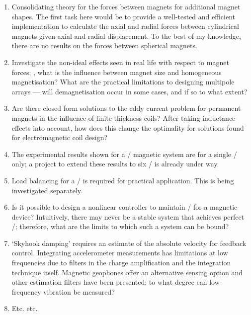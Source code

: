 \begin{enumerate}
\item
Consolidating theory for the forces between magnets for additional magnet shapes.
The first task here would be to provide a well-tested and efficient implementation to calculate the axial and radial forces between cylindrical magnets given axial and radial displacement.
To the best of my knowledge, there are no results on the forces between spherical magnets.

\item
Investigate the non-ideal effects seen in real life with respect to magnet forces; \eg, what is the influence between magnet size and homogeneous magnetisation?
What are the practical limitations to designing multipole arrays — will demagnetisation occur in some cases, and if so to what extent?

\item
Are there closed form solutions to the eddy current problem for permanent magnets in the influence of finite thickness coils?
After taking inductance effects into account, how does this change the optimality for solutions found for electromagnetic coil design?

\item
The experimental results shown for a \qzs/ magnetic system are for a single \dof/ only; a project to extend these results to six \dof/ is already under way.

\item
Load balancing for a \qzs/ is required for practical application.
This is being investigated separately.

\item
Is it possible to design a nonlinear controller to maintain \qzs/ for a magnetic device?
Intuitively, there may never be a stable system that achieves perfect \qzs/; therefore, what are the limits to which such a system can be bound?

\item
`Skyhook damping' requires an estimate of the absolute velocity for feedback control.
Integrating accelerometer measurements has limitations at low frequencies due to filters in the charge amplification and the integration technique itself.
Magnetic geophones offer an alternative sensing option and other estimation filters have been presented; to what degree can low-frequency vibration be measured?

\item
Etc. etc.

\end{enumerate}

